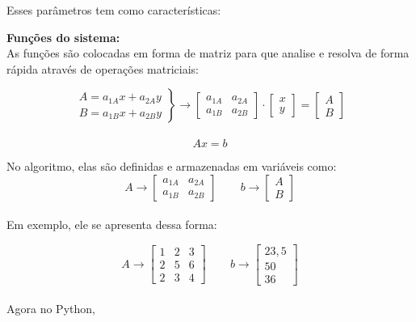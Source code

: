 \documentclass[
	12pt,				%
	openright,			%
	twoside,			%
	a4paper,			%
	english,			%
	french,				%
	spanish,			%
	brazil				%
	]{abntex2_new}
\begin{document}
Esses parâmetros tem como características:

\begin{alineas}
	\item{\textbf{Funções do sistema:}\\
	As funções são colocadas em forma de matriz para que
	analise e resolva de forma rápida através de operações
	matriciais:

$$\left.\begin{aligned}
	A=a_{1A} x + a_{2A} y\\
	B=a_{1B} x + a_{2B} y
	\end{aligned}
	\right\} \rightarrow
  \begin{bmatrix}
	a_{1A} & a_{2A} \\
	a_{1B} & a_{2B}
	\end{bmatrix} \cdot
	 \begin{bmatrix}
	x \\
	y
	\end{bmatrix}
	= 
		 \begin{bmatrix}
	A \\
	B
	\end{bmatrix}
$$\\
$$Ax=b$$

No algoritmo, elas são definidas e armazenadas em variáveis como:
$$	A \rightarrow   \begin{bmatrix}
a_{1A} & a_{2A} \\
a_{1B} & a_{2B}
\end{bmatrix} \hspace{25pt}
b \rightarrow  \begin{bmatrix}
A \\
B
\end{bmatrix}
$$\\

Em exemplo, ele se apresenta dessa forma:

$$	A \rightarrow   \begin{bmatrix}
1 & 2 & 3 \\
2 & 5 & 6 \\
2 & 3 & 4
\end{bmatrix} \hspace{25pt}
b \rightarrow  \begin{bmatrix}
23,5 \\
50 \\
36
\end{bmatrix}
$$\\

Agora no Python,\\


}
\end{alineas}
\end{document}
